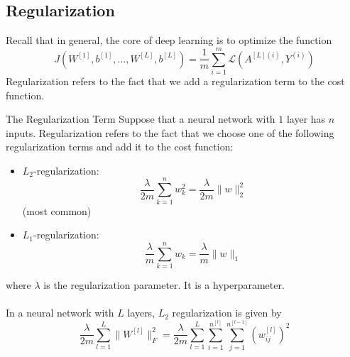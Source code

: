 \documentclass[a4paper]{article}
\begin{document}
\begin{enumerate}
\subsection{Regularization}
Recall that in general, the core of deep learning is to optimize the function $$J(W^{[1]},b^{[1]},\dots,W^{[L]},b^{[L]})=\frac{1}{m}
\sum_{i=1}^m\mathcal{L}(A^{[L](i)},Y^{(i)})$$ Regularization refers to the fact that we add a regularization term to the cost function. 

\begin{defn}{The Regularization Term}{} Suppose that a neural network with $1$ layer has $n$ inputs. Regularization refers to the fact that we choose one of the following regularization terms and add it to the cost function: 
\begin{itemize}
\item $L_2$-regularization: $$\frac{\lambda}{2m}\sum_{k=1}^n w_k^2=\frac{\lambda}{2m}\|w\|_2^2$$ (most common)
\item $L_1$-regularization: $$\frac{\lambda}{m}\sum_{k=1}^n w_k=\frac{\lambda}{m}\|w\|_1$$
\end{itemize}
where $\lambda$ is the regularization parameter. It is a hyperparameter. \\~\\
In a neural network with $L$ layers, $L_2$ regularization is given by $$\frac{\lambda}{2m}\sum_{l=1}^L\|W^{[l]}\|_F^2=\frac{\lambda}{2m}\sum_{l=1}^L\sum_{i=1}^{n^{[l]}}\sum_{j=1}^{n^{[l-1]}}(w_{ij}^{[l]})^2$$
\end{defn}


\end{enumerate}
\end{document}
